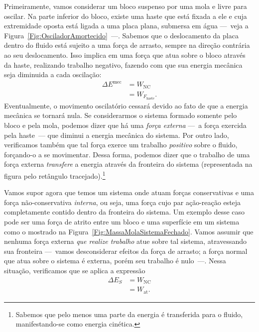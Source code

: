 Primeiramente, vamos considerar um bloco suspenso por uma mola e livre para oscilar. Na parte inferior do bloco, existe uma haste que está fixada a ele e cuja extremidade oposta está ligada a uma placa plana, submersa em água ---~veja a Figura~\ref{Fig:OsciladorAmortecido}~---. Sabemos que o deslocamento da placa dentro do fluido está sujeito a uma força de arrasto, sempre na direção contrária ao seu deslocamento. Isso implica em uma força que atua sobre o bloco através da haste, realizando trabalho negativo, fazendo com que sua energia mecânica seja diminuida a cada oscilação:
\begin{align}
    \Delta E^{\text{mec}} &= W_{\text{NC}} \\
    &= W_{F_{\text{haste}}}.
\end{align}
%
Eventualmente, o movimento oscilatório cessará devido ao fato de que a energia mecânica se tornará nula. Se considerarmos o sistema formado somente pelo bloco e pela mola, podemos dizer que há uma \emph{força externa} ---~a força exercida pela haste~--- que diminui a energia mecânica do sistema. Por outro lado, verificamos também que tal força exerce um trabalho \emph{positivo} sobre o fluido, forçando-o a se movimentar. Dessa forma, podemos dizer que o trabalho de uma força externa \emph{transfere} a energia através da fronteira do sistema (representada na figura pelo retângulo tracejado).\footnote{Sabemos que pelo menos uma parte da energia é transferida para o fluido, manifestando-se como energia cinética.}

Vamos supor agora que temos um sistema onde atuam forças conservativas e uma força não-conservativa \emph{interna}, ou seja, uma força cujo par ação-reação esteja completamente contido dentro da fronteira do sistema. Um exemplo desse caso pode ser uma força de atrito entre um bloco e uma superfície em um sistema como o mostrado na Figura~\ref{Fig:MassaMolaSistemaFechado}. Vamos assumir que nenhuma força externa \emph{que realize trabalho} atue sobre tal sistema, atravessando sua fronteira ---~vamos desconsiderar efeitos da força de arrasto; a força normal que atua sobre o sistema é externa, porém seu trabalho é nulo~---. Nessa situação, verificamos que se aplica a expressão
\begin{align}
    \Delta E_S &= W_{\text{NC}} \\
    &= W_{\text{at}}.
\end{align}

